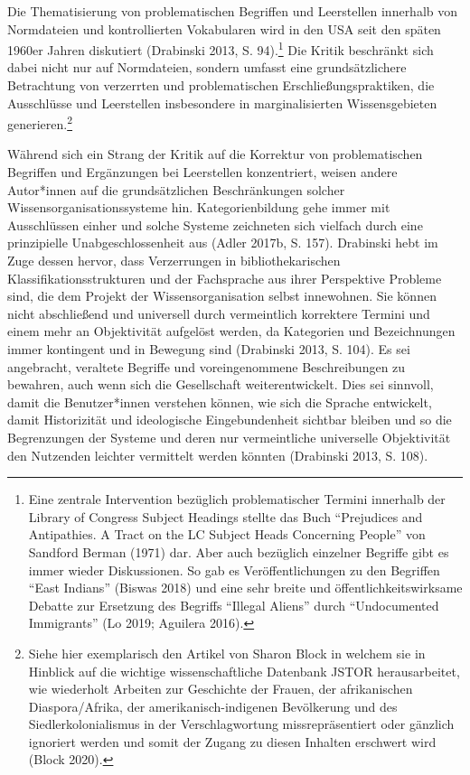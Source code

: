 \documentclass[a4paper,
fontsize=11pt,
oneside,
numbers=noperiodatend,
parskip=half-,
bibliography=totoc,
final
]{scrartcl}
\begin{document}
Die Thematisierung von problematischen Begriffen und Leerstellen
innerhalb von Normdateien und kontrollierten Vokabularen wird in den USA
seit den späten 1960er Jahren diskutiert (Drabinski 2013, S.
94).\footnote{Eine zentrale Intervention bezüglich problematischer
  Termini innerhalb der Library of Congress Subject Headings stellte das
  Buch \enquote{Prejudices and Antipathies. A Tract on the LC Subject
  Heads Concerning People} von Sandford Berman (1971) dar. Aber auch
  bezüglich einzelner Begriffe gibt es immer wieder Diskussionen. So gab
  es Veröffentlichungen zu den Begriffen \enquote{East Indians} (Biswas
  2018) und eine sehr breite und öffentlichkeitswirksame Debatte zur
  Ersetzung des Begriffs \enquote{Illegal Aliens} durch
  \enquote{Undocumented Immigrants} (Lo 2019; Aguilera 2016).} Die
Kritik beschränkt sich dabei nicht nur auf Normdateien, sondern umfasst
eine grundsätzlichere Betrachtung von verzerrten und problematischen
Erschließungspraktiken, die Ausschlüsse und Leerstellen insbesondere in
marginalisierten Wissensgebieten generieren.\footnote{Siehe hier
  exemplarisch den Artikel von Sharon Block in welchem sie in Hinblick
  auf die wichtige wissenschaftliche Datenbank JSTOR herausarbeitet, wie
  wiederholt Arbeiten zur Geschichte der Frauen, der afrikanischen
  Diaspora/Afrika, der amerikanisch-indigenen Bevölkerung und des
  Siedlerkolonialismus in der Verschlagwortung missrepräsentiert oder
  gänzlich ignoriert werden und somit der Zugang zu diesen Inhalten
  erschwert wird (Block 2020).}

Während sich ein Strang der Kritik auf die Korrektur von problematischen
Begriffen und Ergänzungen bei Leerstellen konzentriert, weisen andere
Autor*innen auf die grundsätzlichen Beschränkungen solcher
Wissensorganisationssysteme hin. Kategorienbildung gehe immer mit
Ausschlüssen einher und solche Systeme zeichneten sich vielfach durch
eine prinzipielle Unabgeschlossenheit aus (Adler 2017b, S. 157).
Drabinski hebt im Zuge dessen hervor, dass Verzerrungen in
bibliothekarischen Klassifikationsstrukturen und der Fachsprache aus
ihrer Perspektive Probleme sind, die dem Projekt der Wissensorganisation
selbst innewohnen. Sie können nicht abschließend und universell durch
vermeintlich korrektere Termini und einem mehr an Objektivität aufgelöst
werden, da Kategorien und Bezeichnungen immer kontingent und in Bewegung
sind (Drabinski 2013, S. 104). Es sei angebracht, veraltete Begriffe und
voreingenommene Beschreibungen zu bewahren, auch wenn sich die
Gesellschaft weiterentwickelt. Dies sei sinnvoll, damit die
Benutzer*innen verstehen können, wie sich die Sprache entwickelt, damit
Historizität und ideologische Eingebundenheit sichtbar bleiben und so
die Begrenzungen der Systeme und deren nur vermeintliche universelle
Objektivität den Nutzenden leichter vermittelt werden könnten (Drabinski
2013, S. 108).
\end{document}
